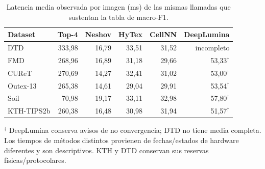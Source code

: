 \begin{table}[!htbp]\centering
\fontsize{8}{10}\selectfont\setlength{\tabcolsep}{4pt}
\caption{Latencia media observada por imagen (ms) de las mismas llamadas que sustentan la tabla de macro-F1.}\label{tab:tm-externos-ms}
\begin{tabular}{@{}lrrrrr@{}}\toprule
Dataset & Top-4 & Neshov & HyTex & CellNN & DeepLumina\\\midrule
DTD & 333,98 & 16,79 & 33,51 & 31,52 & incompleto\\
FMD & 268,96 & 16,89 & 31,18 & 29,66 & 53,33$^\dagger$\\
CUReT & 270,69 & 14,27 & 32,41 & 31,02 & 53,00$^\dagger$\\
Outex-13 & 265,38 & 14,61 & 29,04 & 29,91 & 53,54$^\dagger$\\
Soil & 70,98 & 19,17 & 33,11 & 32,98 & 57,80$^\dagger$\\
KTH-TIPS2b & 260,38 & 16,48 & 30,98 & 31,94 & 51,57$^\dagger$\\
\bottomrule\end{tabular}
\par\smallskip\begin{minipage}{0.98\textwidth}\footnotesize $^\dagger$ DeepLumina conserva avisos de no convergencia; DTD no tiene media completa. Los tiempos de métodos distintos provienen de fechas/estados de hardware diferentes y son descriptivos. KTH y DTD conservan sus reservas físicas/protocolares.\end{minipage}
\end{table}
